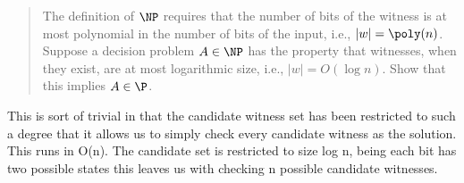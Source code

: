 \begin{exercise}[subtitle = {Small witnesses are easy to find}]
    \begin{quote}
    The definition of $\NP$ requires that the number of bits of the witness is at most polynomial in the number of bits of the input, i.e., $|w| = \poly(n)$.
    Suppose a decision problem $A \in \NP$ has the property that witnesses,
    when they exist, are at most logarithmic size,
    i.e., $|w| = O(\log n)$.
    Show that this implies $A \in \P$.
    \end{quote}
\end{exercise}

\begin{solution}
	This is sort of trivial in that the candidate witness set has been restricted to such a degree that it allows us to simply check every candidate witness as the solution. This runs in O(n). The candidate set is restricted to size log n, being each bit has two possible states this leaves us with checking n possible candidate witnesses.
\end{solution}
